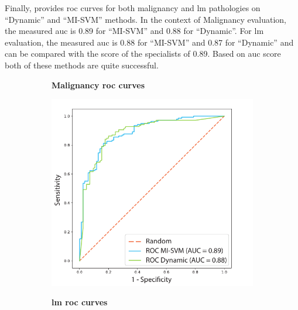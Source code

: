 \documentclass[journal,article,submit,moreauthors,pdftex, applsci]{Definitions/mdpi}
\begin{document}
Finally,  provides \ac{roc} curves for both malignancy and \ac{lm} pathologies on “Dynamic” and “MI-SVM” methods. In the context of Malignancy evaluation, the measured \ac{auc} is 0.89 for “MI-SVM” and 0.88 for “Dynamic”. For \ac{lm} evaluation, the measured \ac{auc} is 0.88 for “MI-SVM” and 0.87 for “Dynamic” and can be compared with the score of the specialists of 0.89. Based on \ac{auc} score both of these methods are quite successful.\par
\begin{figure}[H]
    \centering
    \begin{subfigure}{0.47\linewidth}
        \centering
        \textbf{Malignancy \ac{roc} curves}\par
        \includegraphics[width=\linewidth]{Figures/Result_Malignancy.pdf}
    \end{subfigure}
    \begin{subfigure}{0.47\linewidth}
        \centering
        \textbf{\ac{lm} \ac{roc} curves}\par

\end{subfigure}
\end{figure}
\end{document}

